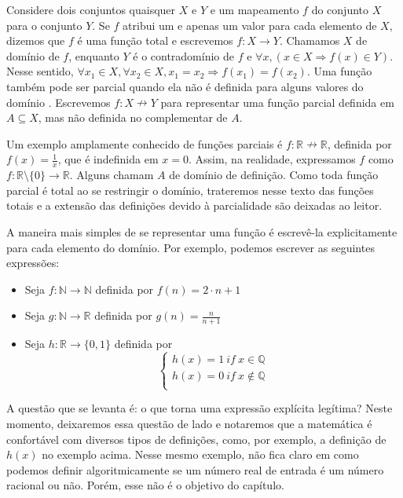 Considere dois conjuntos quaisquer $X$ e $Y$ e um mapeamento $f$ do conjunto
$X$ para o conjunto $Y$. Se $f$ atribui um e apenas um valor para cada
elemento de $X$, dizemos que $f$ é uma função total e escrevemos $f: X \to Y$.
Chamamos $X$ de domínio de $f$, enquanto $Y$ é o contradomínio de $f$ e
$\forall x, (x \in X  \Rightarrow f(x) \in Y)$. Nesse sentido, $\forall x_1
\in X, \forall x_2 \in X, x_1 = x_2 \Rightarrow f(x_1) = f(x_2)$. Uma função
também pode ser parcial quando ela não é definida para alguns valores do
domínio \cite{kevinbook}. Escrevemos $f: X \nrightarrow Y $ para representar uma função parcial
definida em $A \subseteq X $, mas não definida no complementar de $A$. 

Um exemplo amplamente conhecido de funções parciais é $f: \mathbb{R}
\nrightarrow \mathbb{R}$, definida por $f(x) = \frac{1}{x}$, que é indefinida
em $x = 0$. Assim, na realidade, expressamos $f$ como $f : \mathbb{R}
\setminus \{0\} \to \mathbb{R}$. Alguns chamam $A$ de domínio de definição.
Como toda função parcial é total ao se restringir o domínio, trateremos nesse
texto das funções totais e a extensão das definições devido à parcialidade são
deixadas ao leitor.  

A maneira mais simples de se representar uma função é escrevê-la
explicitamente para cada elemento do domínio. Por exemplo, podemos escrever as
seguintes expressões:

\begin{itemize}
    \item Seja $f: \mathbb{N} \to \mathbb{N}$ definida por $f(n) = 2\cdot n +
    1$
    \item Seja $g : \mathbb{N} \to \mathbb{R}$ definida por $g(n) =
    \frac{n}{n+1}$
    \item Seja $h : \mathbb{R} \to \{0,1\}$ definida por
    $$\left \{ \begin{array}{c} h(x) = 1 ~if~x \in \mathbb{Q} \\
    h(x) = 0 ~ if ~ x \not \in \mathbb{Q} \\
    \end{array}
    \right. $$
 \end{itemize}

A questão que se levanta é: o que torna uma expressão explícita legítima?
Neste momento, deixaremos essa questão de lado e notaremos que a matemática é
confortável com diversos tipos de definições, como, por exemplo, a definição
de $h(x)$ no exemplo acima. Nesse mesmo exemplo, não fica claro em como
podemos definir algoritmicamente se um número real de entrada é um número
racional ou não. Porém, esse não é o objetivo do capítulo.

